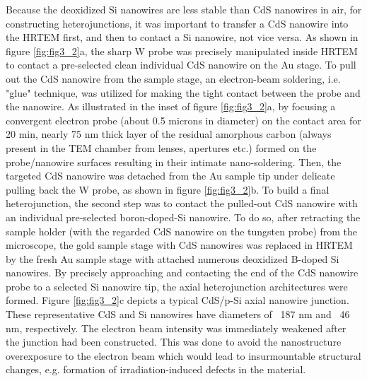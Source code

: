 Because the deoxidized Si nanowires are less stable than CdS nanowires in air, for constructing heterojunctions, it was important to transfer a CdS nanowire into the HRTEM first, and then to contact a Si nanowire, not vice versa. As shown in figure \ref{fig:fig3_2}a, the sharp W probe was precisely manipulated inside HRTEM to contact a pre-selected clean individual CdS nanowire on the Au stage. To pull out the CdS nanowire from the sample stage, an electron-beam soldering, i.e. "glue" technique, was utilized for making the tight contact between the probe and the nanowire. As illustrated in the inset of figure \ref{fig:fig3_2}a, by focusing a convergent electron probe (about 0.5 microns in diameter) on the contact area for 20 min, nearly 75 nm thick layer of the residual amorphous carbon (always present in the TEM chamber from lenses, apertures etc.) formed on the probe/nanowire surfaces  resulting in their intimate nano-soldering. Then, the targeted CdS nanowire was detached from the Au sample tip under delicate pulling back the W probe, as shown in figure \ref{fig:fig3_2}b. To build a final heterojunction, the second step was to contact the pulled-out CdS nanowire with an individual pre-selected boron-doped-Si nanowire. To do so, after retracting the sample holder (with the regarded CdS nanowire on the tungsten probe) from the microscope, the gold sample stage with CdS nanowires was replaced in HRTEM by the fresh Au sample stage with attached numerous deoxidized B-doped Si nanowires. By precisely approaching and contacting the end of the CdS nanowire probe to a selected Si nanowire tip, the axial heterojunction architectures were formed. Figure \ref{fig:fig3_2}c depicts a typical CdS/p-Si axial nanowire junction. These representative CdS and Si nanowires have diameters of ~187 nm and ~46 nm, respectively. The electron beam intensity was immediately weakened after the junction had been constructed. This was done to avoid the nanostructure overexposure to the electron beam which would lead to insurmountable structural changes, e.g. formation of irradiation-induced defects in the material.


